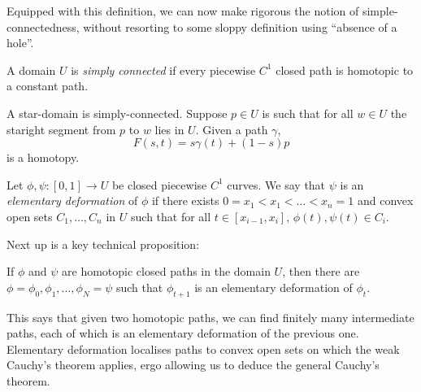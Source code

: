 \documentclass[a4paper]{article}
\begin{document}
Equipped with this definition, we can now make rigorous the notion of simple-connectedness, without resorting to some sloppy definition using ``absence of a hole''.

\begin{definition}
  A domain \(U\) is \emph{simply connected} if every piecewise \(C^1\) closed path is homotopic to a constant path.
\end{definition}

\begin{eg}
  A star-domain is simply-connected. Suppose \(p \in U\) is such that for all \(w \in U\) the staright segment from \(p\) to \(w\) lies in \(U\). Given a path \(\gamma\),
  \[
    F(s, t) = s \gamma(t) + (1 - s)p
  \]
  is a homotopy.
\end{eg}

\begin{definition}
  Let \(\phi, \psi: [0, 1] \to U\) be closed piecewise \(C^1\) curves. We say that \(\psi\) is an \emph{elementary deformation} of \(\phi\) if there exists \(0 = x_1 < x_1 < \dots < x_n = 1\) and convex open sets \(C_1, \dots, C_n\) in \(U\) such that for all \(t \in [x_{i - 1}, x_i]\), \(\phi(t), \psi(t) \in C_i\).
\end{definition}

Next up is a key technical proposition:

\begin{proposition}
  If \(\phi\) and \(\psi\) are homotopic closed paths in the domain \(U\), then there are \(\phi = \phi_0, \phi_1, \dots, \phi_N = \psi\) such that \(\phi_{t + 1}\) is an elementary deformation of \(\phi_t\).
\end{proposition}

This says that given two homotopic paths, we can find finitely many intermediate paths, each of which is an elementary deformation of the previous one. Elementary deformation localises paths to convex open sets on which the weak Cauchy's theorem applies, ergo allowing us to deduce the general Cauchy's theorem.



\printindex

\iffalse
past lecture notes:
T. Scholl, K. Carne

Book
Ahlfors, Complex Analysis
\fi
\end{document}
